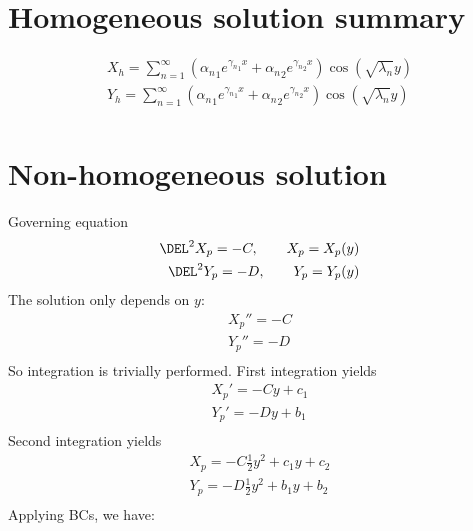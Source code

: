\documentclass[11pt]{article}
\begin{document}
\section{Homogeneous solution summary}
\begin{equation}\begin{aligned}
X_h = \sum_{n=1}^{\infty} \left( {\alpha_n}_1 e^{{\gamma_n}_1 x} + {\alpha_n}_2 e^{{\gamma_n}_2 x} \right) \cos(\sqrt{\lambda_n} y) \\
Y_h = \sum_{n=1}^{\infty} \left( {\alpha_n}_1 e^{{\gamma_n}_1 x} + {\alpha_n}_2 e^{{\gamma_n}_2 x} \right) \cos(\sqrt{\lambda_n} y) \\
\end{aligned} \end{equation}

\section{Non-homogeneous solution}
Governing equation
\begin{equation}\begin{aligned}
\DEL^2 X_p = -C, \qquad X_p = X_p(y) \\
\DEL^2 Y_p = -D, \qquad Y_p = Y_p(y) \\
\end{aligned} \end{equation}
The solution only depends on $y$:
\begin{equation}\begin{aligned}
X_p'' = -C \\
Y_p'' = -D \\
\end{aligned} \end{equation}
So integration is trivially performed. First integration yields
\begin{equation}\begin{aligned}
X_p' = -C y + c_1 \\
Y_p' = -D y + b_1 \\
\end{aligned} \end{equation}
Second integration yields
\begin{equation}\begin{aligned}
X_p = -C \frac{1}{2} y^2 + c_1 y + c_2 \\
Y_p = -D \frac{1}{2} y^2 + b_1 y + b_2 \\
\end{aligned} \end{equation}
Applying BCs, we have:
\end{document}
